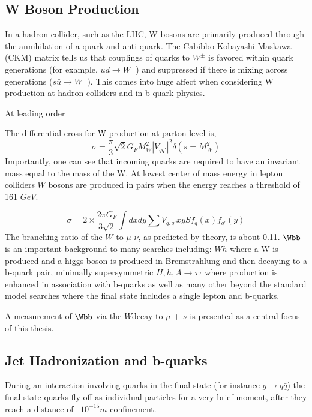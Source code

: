 \subsection{W Boson Production}
In a hadron collider, such as the LHC, W bosons are primarily produced
through the annihilation of a quark and anti-quark. 
The Cabibbo Kobayashi Maskawa (CKM) matrix tells us that
couplings of quarks to $W^{\pm}$ is favored within quark generations (for example, $u\bar{d}\rightarrow W^{+}$)
and suppressed if there is mixing across generations ($s\bar{u}\rightarrow W^{-}$).
This comes into huge affect when considering W production at hadron colliders and in b quark physics. %

At leading order

The differential cross for W production at parton level is,
\begin{equation}
\sigma=\frac{\pi}{3}\sqrt{2}G_{F}M_{W}^{2}|V_{qq'}|^{2}\delta(s=M_{W}^{2})
\end{equation}
Importantly, one can see that incoming quarks are required to have an invariant
mass equal to the mass of the W. 
At lowest center of mass energy in
lepton colliders $W$ bosons are produced in pairs when the energy reaches a threshold of 161 $GeV$. 

\begin{equation}
\sigma=2\times\frac{2\pi G_{F}}{3\sqrt{2}}\int{dxdy \sum{V_{q,\bar{q}'}}xyS f_{q}(x)f_{\bar{q}'}(y)}
\end{equation}
The branching ratio of the $W$ to $\mu$ $\nu$, as predicted by theory, is about 0.11. 
$\Wbb$ is an important background to many searches including:
$Wh$ where a W is produced and a higgs boson is produced in Bremstrahlung %
and then decaying to a b-quark pair, minimally supersymmetric $H,h,A\rightarrow \tau\tau$
where production is enhanced in association with b-quarks as well as many other beyond the standard
model searches where the final state includes a single lepton and b-quarks. 

A measurement of $\Wbb$ via the $W$\s decay to $\mu$ + $\nu$ is presented as a 
central focus of this thesis.

\subsection{Jet Hadronization and b-quarks}%
During an interaction involving quarks in the final state (for instance $g\rightarrow q\bar{q}$)
the final state quarks fly off as individual particles for a very brief moment, after they reach
a distance of ~$10^{-15}m$ confinement.

